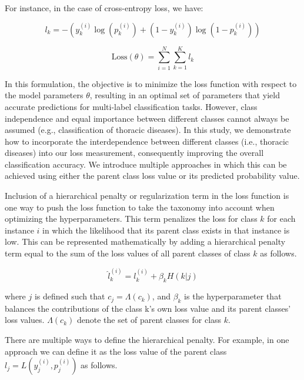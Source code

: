 For instance, in the case of cross-entropy loss, we have:

\begin{equation}
    l_k = -\left(y_k^{(i)}\log(p_k^{(i)}) + (1 - y_k^{(i)})\log(1 - p_k^{(i)})\right)
    \label{Taxonomy.Eq.Loss}
\end{equation}

\begin{equation}
    \text{Loss}(\theta) = \sum_{i=1}^{N}\sum_{k=1}^{K}l_k
    \label{Taxonomy.Eq.TotalLoss}
\end{equation}

In this formulation, the objective is to minimize the loss function with respect to the model parameters $\theta $, resulting in an optimal set of parameters that yield accurate predictions for multi-label classification tasks. However, class independence and equal importance between different classes cannot always be assumed (e.g., classification of thoracic diseases). In this study, we demonstrate how to incorporate the interdependence between different classes (i.e., thoracic diseases) into our loss measurement, consequently improving the overall classification accuracy. We introduce multiple approaches in which this can be achieved using either the parent class loss value or its predicted probability value.

Inclusion of a hierarchical penalty or regularization term in the loss function is one way to push the loss function to take the taxonomy into account when optimizing the hyperparameters. This term penalizes the loss for class $k $ for each instance $i $ in which the likelihood that its parent class exists in that instance is low. This can be represented mathematically by adding a hierarchical penalty term equal to the sum of the loss values of all parent classes of class $k $ as follows.

\begin{equation}
    \widehat{l}_{k}^{(i)} = l_{k}^{(i)}+\beta_k H (k \vert j)
    \label{Taxonomy.Eq.3.newloss}
\end{equation}

where $j $ is defined such that $c_j=\Lambda(c_k) $, and $\beta_k $ is the hyperparameter that balances the contributions of the class k's own loss value and its parent classes' loss values. $\Lambda(c_k) $ denote the set of parent classes for class $k $.

There are multiple ways to define the hierarchical penalty. For example, in one approach we can define it as the loss value of the parent class $l_j=L\left(y_j^{(i)},p_j^{(i)}\right) $ as follows.


